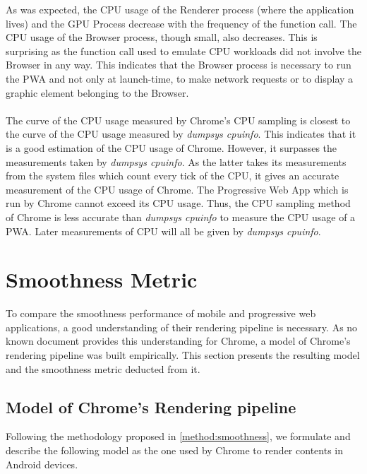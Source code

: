 \documentclass{kththesis}
\begin{document}
As was expected, the CPU usage of the Renderer process (where the application lives) and the GPU Process decrease with the frequency of the function call. The CPU usage of the Browser process, though small, also decreases. This is surprising as the function call used to emulate CPU workloads did not involve the Browser in any way. This indicates that the Browser process is necessary to run the PWA and not only at launch-time, to make network requests or to display a graphic element belonging to the Browser.

\paragraph{}
The curve of the CPU usage measured by Chrome's CPU sampling is closest to the curve of the CPU usage measured by \textit{dumpsys cpuinfo}. This indicates that it is a good estimation of the CPU usage of Chrome. However, it surpasses the measurements taken by \textit{dumpsys cpuinfo}. As the latter takes its measurements from the system files which count every tick of the CPU, it gives an accurate measurement of the CPU usage of Chrome. The Progressive Web App which is run by Chrome cannot exceed its CPU usage. Thus, the CPU sampling method of Chrome is less accurate than \textit{dumpsys cpuinfo} to measure the CPU usage of a PWA. Later measurements of CPU will all be given by \textit{dumpsys cpuinfo}.

\section{Smoothness Metric}

To compare the smoothness performance of mobile and progressive web applications, a good understanding of their rendering pipeline is necessary. As no known document provides this understanding for Chrome, a model of Chrome's rendering pipeline was built empirically. This section presents the resulting model and the smoothness metric deducted from it. 

\subsection{Model of Chrome's Rendering pipeline}
\label{results:chrome_model}

Following the methodology proposed in \autoref{method:smoothness}, we formulate and describe the following model as the one used by Chrome to render contents in Android devices.
\end{document}
